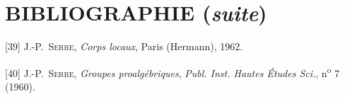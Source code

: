 {}
\section*{BIBLIOGRAPHIE (\emph{suite})}

\begingroup
\small
\setlength{\parindent}{0pt}
\setlength{\parskip}{3pt}
[39] J.-P.~\textsc{Serre}, \emph{Corps locaux}, Paris (Hermann), 1962.

[40] J.-P.~\textsc{Serre}, \emph{Groupes proalgébriques}, \emph{Publ. Inst. Hautes Études Sci.}, n\textsuperscript{o} 7 (1960).

\endgroup

\clearpage
